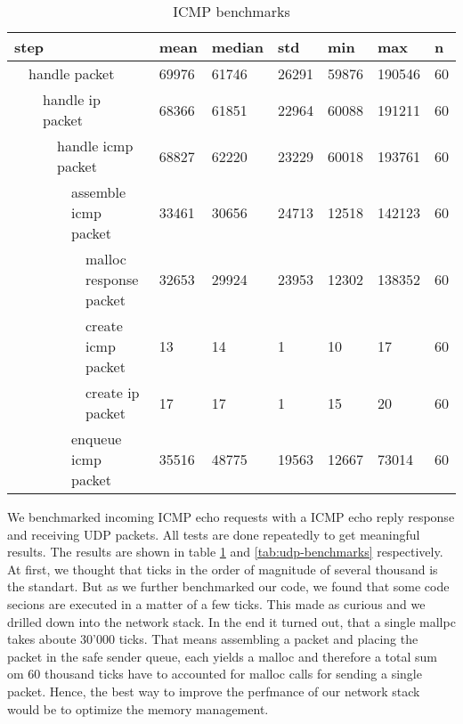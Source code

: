 \begin{table}[]
    \begin{tabular}{|llllll|l|l|l|l|l|l|}
    \hline
    \multicolumn{6}{|l|}{step} & mean & median & std & min & max & n \\ \hline
    \multicolumn{1}{|l|}{} & \multicolumn{5}{l|}{handle packet} & 69976 & 61746 & 26291 & 59876 & 190546 & 60 \\
    \multicolumn{1}{|l|}{} & \multicolumn{1}{l|}{} & \multicolumn{4}{l|}{handle ip packet} & 68366 & 61851 & 22964 & 60088 & 191211 & 60 \\
    \multicolumn{1}{|l|}{} & \multicolumn{1}{l|}{} & \multicolumn{1}{l|}{} & \multicolumn{3}{l|}{handle icmp packet} & 68827 & 62220 & 23229 & 60018 & 193761 & 60 \\
    \multicolumn{1}{|l|}{} & \multicolumn{1}{l|}{} & \multicolumn{1}{l|}{} & \multicolumn{1}{l|}{} & \multicolumn{2}{l|}{assemble icmp packet} & 33461 & 30656 & 24713 & 12518 & 142123 & 60 \\
    \multicolumn{1}{|l|}{} & \multicolumn{1}{l|}{} & \multicolumn{1}{l|}{} & \multicolumn{1}{l|}{} & \multicolumn{1}{l|}{} & malloc response packet & 32653 & 29924 & 23953 & 12302 & 138352 & 60 \\
    \multicolumn{1}{|l|}{} & \multicolumn{1}{l|}{} & \multicolumn{1}{l|}{} & \multicolumn{1}{l|}{} & \multicolumn{1}{l|}{} & create icmp packet & 13 & 14 & 1 & 10 & 17 & 60 \\
    \multicolumn{1}{|l|}{} & \multicolumn{1}{l|}{} & \multicolumn{1}{l|}{} & \multicolumn{1}{l|}{} & \multicolumn{1}{l|}{} & create ip packet & 17 & 17 & 1 & 15 & 20 & 60 \\
    \multicolumn{1}{|l|}{} & \multicolumn{1}{l|}{} & \multicolumn{1}{l|}{} & \multicolumn{1}{l|}{} & \multicolumn{2}{l|}{enqueue icmp packet} & 35516 & 48775 & 19563 & 12667 & 73014 & 60 \\
    \hline
    \end{tabular}
    \caption{ICMP benchmarks}
    \label{tab:icmp-benchmarks}
\end{table}

We benchmarked incoming ICMP echo requests with a ICMP echo reply response and
receiving UDP packets. All tests are done repeatedly to get meaningful results. 
The results are shown in table \ref{tab:icmp-benchmarks} and
\ref{tab:udp-benchmarks} respectively. At first, we thought that ticks in the
order of magnitude of several thousand is the standart. But as we further
benchmarked our code, we found that some code secions are executed in a matter
of a few ticks. This made as curious and we drilled down into the network stack.
In the end it turned out, that a single mallpc takes aboute 30'000 ticks. That
means assembling a packet and placing the packet in the safe sender queue, each
yields a malloc and therefore a total sum om 60 thousand ticks have to accounted
for malloc calls for sending a single packet.  Hence, the best way to improve
the perfmance of our network stack would be to optimize the memory management.

